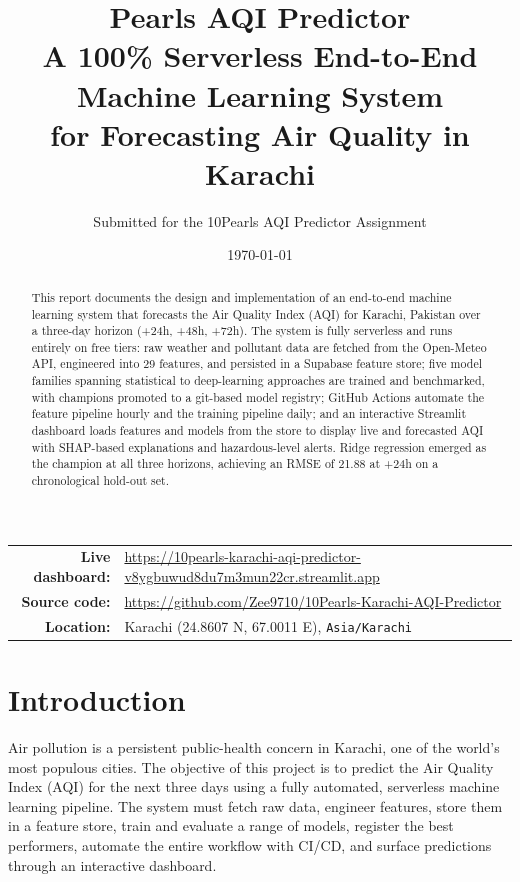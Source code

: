 \documentclass[11pt,a4paper]{article}
\title{\vspace{-1cm}\textbf{\color{primary}\Huge Pearls AQI Predictor}\\[0.4cm]
{\Large A 100\% Serverless End-to-End Machine Learning System\\
for Forecasting Air Quality in Karachi}}
\author{Submitted for the 10Pearls AQI Predictor Assignment}
\date{\today}
\begin{document}
\maketitle
\thispagestyle{empty}

\begin{abstract}
\noindent
This report documents the design and implementation of an end-to-end machine
learning system that forecasts the Air Quality Index (AQI) for Karachi,
Pakistan over a three-day horizon (+24h, +48h, +72h). The system is fully
serverless and runs entirely on free tiers: raw weather and pollutant data are
fetched from the Open-Meteo API, engineered into 29 features, and persisted in a
Supabase feature store; five model families spanning statistical to deep-learning
approaches are trained and benchmarked, with champions promoted to a git-based
model registry; GitHub Actions automate the feature pipeline hourly and the
training pipeline daily; and an interactive Streamlit dashboard loads features
and models from the store to display live and forecasted AQI with SHAP-based
explanations and hazardous-level alerts. Ridge regression emerged as the
champion at all three horizons, achieving an RMSE of 21.88 at +24h on a
chronological hold-out set.
\end{abstract}

\vspace{0.5cm}
\begin{center}
\begin{tabular}{rl}
\textbf{Live dashboard:} & \url{https://10pearls-karachi-aqi-predictor-v8ygbuwud8du7m3mun22cr.streamlit.app}\\
\textbf{Source code:} & \url{https://github.com/Zee9710/10Pearls-Karachi-AQI-Predictor}\\
\textbf{Location:} & Karachi (24.8607\textdegree{} N, 67.0011\textdegree{} E), \texttt{Asia/Karachi}\\
\end{tabular}
\end{center}

\newpage
\tableofcontents
\newpage

\section{Introduction}
Air pollution is a persistent public-health concern in Karachi, one of the
world's most populous cities. The objective of this project is to predict the
Air Quality Index (AQI) for the next three days using a fully automated,
serverless machine learning pipeline. The system must fetch raw data, engineer
features, store them in a feature store, train and evaluate a range of models,
register the best performers, automate the entire workflow with CI/CD, and
surface predictions through an interactive dashboard.
\end{document}
